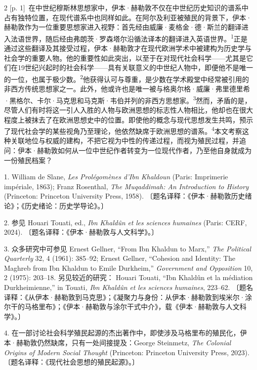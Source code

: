 \documentclass[10pt,a4paper]{article}
\begin{document}
\begin{paracol}{2}
{\scriptsize\color{gray} [p. 1]}\ 在中世纪穆斯林思想家中，伊本·赫勒敦不仅在中世纪历史知识的谱系中占有独特位置，在现代谱系中也同样如此。在阿尔及利亚被殖民的背景下，伊本·赫勒敦作为一位重要思想家进入视野：首先经由威廉·麦格金·德·斯兰的翻译进入法语世界，随后经由弗朗茨·罗森塔尔沿循法译本的翻译进入英语世\mbox{界。\textsuperscript{1}}正是通过这些翻译及其接受过程，伊本·赫勒敦才在现代欧洲学术中被建构为历史学与社会学的重要人物。他的重要性如此突出，以至于在对现代社会科学——尤其是它们在19世纪兴起时的社会科学——具有关联意义的中世纪人物中，即便他不是唯一的一位，也属于极少\mbox{数。\textsuperscript{2}}他获得认可与尊重，是少数在学术殿堂中经常被引用的非西方传统思想家之一。此外，他或许也是唯一被与格奥尔格·威廉·弗里德里希·黑格尔、卡尔·马克思和马克斯·韦伯并列的非西方思想\mbox{家。\textsuperscript{3}}然而，矛盾的是，尽管人们有时将这一引人入胜的人物与欧洲思想的标志性人物相比，他却也在很大程度上被抹去了在欧洲思想史中的位置。即使他的概念与现代思想发生共鸣，预示了现代社会学的某些视角乃至理论，他依然缺席于欧洲思想的谱\mbox{系。\textsuperscript{4}}本文考察这种关联地位与权威的建构，不把它视为中性的传递过程，而视为殖民过程，并追问：伊本·赫勒敦如何从一位中世纪作者转变为一位现代作者，乃至他自身就成为一份殖民档案？\par{\small 1. William de Slane, \textit{Les Prolégomènes d’Ibn Khaldoun} (Paris: Imprimerie impériale, 1863); Franz Rosenthal, \textit{The Muqaddimah: An Introduction to History} (Princeton: Princeton University Press, 1958). 〔题名译释：《伊本·赫勒敦历史绪论》；《历史绪论：历史学导论》。〕\par}{\small 2. 参见 Houari Touati, ed., \textit{Ibn Khaldûn et les sciences humaines} (Paris: CERF, 2024). 〔题名译释：《伊本·赫勒敦与人文科学》。〕\par}{\small 3. 众多研究中可参见 Ernest Gellner, “From Ibn Khaldun to Marx,” \textit{The Political Quarterly} 32, 4 (1961): 385–92; Ernest Gellner, “Cohesion and Identity: The Maghreb from Ibn Khaldun to Emile Durkheim,” \textit{Government and Opposition} 10, 2 (1975): 203–18. 另见较近的研究： Houari Touati, “Ibn Khaldûn et la médiation Durkheimienne,” in Touati\textit{, Ibn Khaldûn et les sciences humaines}, 223–62. 〔题名译释：《从伊本·赫勒敦到马克思》；《凝聚力与身份：从伊本·赫勒敦到埃米尔·涂尔干的马格里布》；《伊本·赫勒敦与涂尔干式中介》，载《伊本·赫勒敦与人文科学》。〕\par}{\small 4. 在一部讨论社会科学殖民起源的杰出著作中，即使涉及马格里布的殖民化，伊本·赫勒敦仍然缺席，只有一处间接提及：George Steinmetz, \textit{The Colonial Origins of Modern Social Thought} (Princeton: Princeton University Press, 2023). 〔题名译释：《现代社会思想的殖民起源》。〕\par}

\end{paracol}
\end{document}
